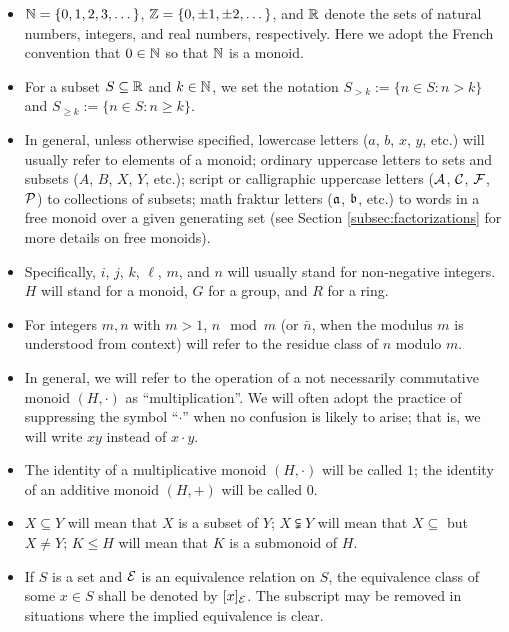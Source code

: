 \begin{itemize}
	\item $\NN = \{0,1,2,3,\dots\}$, $\ZZ = \{0,\pm 1, \pm 2,\dots\}$, and $\RR$ denote the sets of natural numbers, integers, and real numbers, respectively.
	Here we adopt the French convention that $0\in \NN$ so that $\NN$ is a monoid.
	
	\item For a subset $S\subseteq \RR$ and $k\in \NN$, we set the notation $S_{>k} := \{n\in S: n>k\}$ and $S_{\ge k} := \{n\in S: n\ge k\}$.
	
	\item In general, unless otherwise specified, lowercase letters ($a$, $b$, $x$, $y$, etc.) will usually refer to elements of a monoid; ordinary uppercase letters to sets and subsets ($A$, $B$, $X$, $Y$, etc.); script or calligraphic uppercase letters ($\A$, $\C$, $\F$, $\P$) to collections of subsets; math fraktur letters ($\aa$, $\bb$, etc.) to words in a free monoid over a given generating set (see Section \ref{subsec:factorizations} for more details on free monoids).
	
	\item Specifically, $i$, $j$, $k$, $\ell$, $m$, and $n$ will usually stand for non-negative integers. 
	$H$ will stand for a monoid, $G$ for a group, and $R$ for a ring.
	
	\item For integers $m,n$ with $m>1$, $n \mod m$ (or $\bar{n}$, when the modulus $m$ is understood from context) will refer to the residue class of $n$ modulo $m$.
	
	\item In general, we will refer to the operation of a not necessarily commutative monoid $(H,\cdot)$ as ``multiplication''.
	We will often adopt the practice of suppressing the symbol ``$\cdot$'' when no confusion is likely to arise; that is, we will write $xy$ instead of $x\cdot y$.
	
	\item The identity of a multiplicative monoid $(H,\cdot)$ will be called $1$; the identity of an additive monoid $(H,+)$ will be called $0$.
	
	\item $X\subseteq Y$ will mean that $X$ is a subset of $Y$; $X\subsetneqq Y$ will mean that $X\subseteq$ but $X\neq Y$; $K\le H$ will mean that $K$ is a submonoid of $H$.
	
	\item If $S$ is a set and $\E$ is an equivalence relation on $S$, the equivalence class of some $x\in S$ shall be denoted by $[x]_\E$.
	The subscript may be removed in situations where the implied equivalence is clear.
	

\end{itemize}
